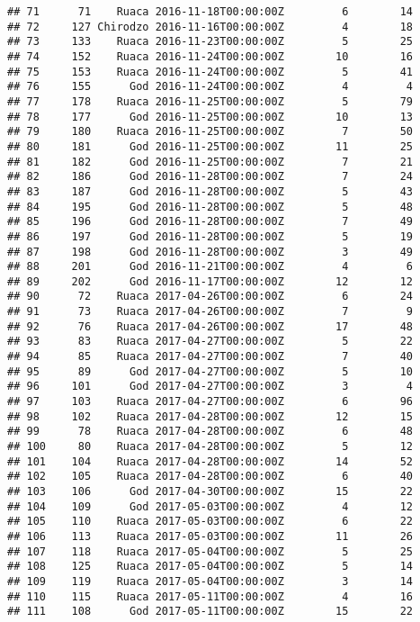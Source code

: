 \documentclass[
]{article}
\begin{document}
\begin{verbatim}
## 71      71    Ruaca 2016-11-18T00:00:00Z         6        14
## 72     127 Chirodzo 2016-11-16T00:00:00Z         4        18
## 73     133    Ruaca 2016-11-23T00:00:00Z         5        25
## 74     152    Ruaca 2016-11-24T00:00:00Z        10        16
## 75     153    Ruaca 2016-11-24T00:00:00Z         5        41
## 76     155      God 2016-11-24T00:00:00Z         4         4
## 77     178    Ruaca 2016-11-25T00:00:00Z         5        79
## 78     177      God 2016-11-25T00:00:00Z        10        13
## 79     180    Ruaca 2016-11-25T00:00:00Z         7        50
## 80     181      God 2016-11-25T00:00:00Z        11        25
## 81     182      God 2016-11-25T00:00:00Z         7        21
## 82     186      God 2016-11-28T00:00:00Z         7        24
## 83     187      God 2016-11-28T00:00:00Z         5        43
## 84     195      God 2016-11-28T00:00:00Z         5        48
## 85     196      God 2016-11-28T00:00:00Z         7        49
## 86     197      God 2016-11-28T00:00:00Z         5        19
## 87     198      God 2016-11-28T00:00:00Z         3        49
## 88     201      God 2016-11-21T00:00:00Z         4         6
## 89     202      God 2016-11-17T00:00:00Z        12        12
## 90      72    Ruaca 2017-04-26T00:00:00Z         6        24
## 91      73    Ruaca 2017-04-26T00:00:00Z         7         9
## 92      76    Ruaca 2017-04-26T00:00:00Z        17        48
## 93      83    Ruaca 2017-04-27T00:00:00Z         5        22
## 94      85    Ruaca 2017-04-27T00:00:00Z         7        40
## 95      89      God 2017-04-27T00:00:00Z         5        10
## 96     101      God 2017-04-27T00:00:00Z         3         4
## 97     103    Ruaca 2017-04-27T00:00:00Z         6        96
## 98     102    Ruaca 2017-04-28T00:00:00Z        12        15
## 99      78    Ruaca 2017-04-28T00:00:00Z         6        48
## 100     80    Ruaca 2017-04-28T00:00:00Z         5        12
## 101    104    Ruaca 2017-04-28T00:00:00Z        14        52
## 102    105    Ruaca 2017-04-28T00:00:00Z         6        40
## 103    106      God 2017-04-30T00:00:00Z        15        22
## 104    109      God 2017-05-03T00:00:00Z         4        12
## 105    110    Ruaca 2017-05-03T00:00:00Z         6        22
## 106    113    Ruaca 2017-05-03T00:00:00Z        11        26
## 107    118    Ruaca 2017-05-04T00:00:00Z         5        25
## 108    125    Ruaca 2017-05-04T00:00:00Z         5        14
## 109    119    Ruaca 2017-05-04T00:00:00Z         3        14
## 110    115    Ruaca 2017-05-11T00:00:00Z         4        16
## 111    108      God 2017-05-11T00:00:00Z        15        22

\end{verbatim}
\end{document}
